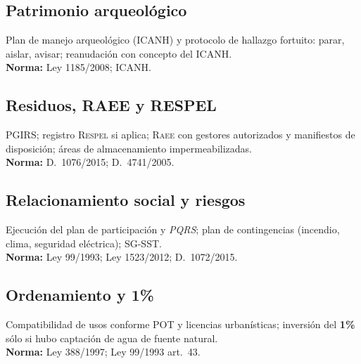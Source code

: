 \subsection{Patrimonio arqueológico}
Plan de manejo arqueológico (ICANH) y protocolo de hallazgo fortuito: parar, aislar, avisar; reanudación con concepto del ICANH.\\
\textbf{Norma:} Ley 1185/2008; ICANH.

\subsection{Residuos, RAEE y RESPEL}
PGIRS; registro \textsc{Respel} si aplica; \textsc{Raee} con gestores autorizados y manifiestos de disposición; áreas de almacenamiento impermeabilizadas.\\
\textbf{Norma:} D.~1076/2015; D.~4741/2005.

\subsection{Relacionamiento social y riesgos}
Ejecución del plan de participación y \emph{PQRS}; plan de contingencias (incendio, clima, seguridad eléctrica); SG-SST.\\
\textbf{Norma:} Ley 99/1993; Ley 1523/2012; D.~1072/2015.

\subsection{Ordenamiento y 1\%}
Compatibilidad de usos conforme POT y licencias urbanísticas; inversión del \textbf{1\%} sólo si hubo captación de agua de fuente natural.\\
\textbf{Norma:} Ley 388/1997; Ley 99/1993 art.~43.
